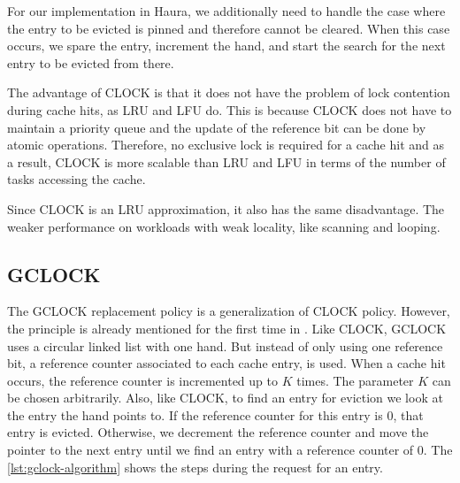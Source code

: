\documentclass[
	12pt,
	a4paper,
	abstract,
	bibliography=totoc,
	chapterprefix,
	headings=openright,
	numbers=endperiod,
	parskip=half,
	twoside,
]{scrreprt}
\begin{document}
For our implementation in Haura, we additionally need to handle the case where the entry to be 
evicted is pinned and therefore cannot be cleared.
When this case occurs, we spare the entry, increment the hand, and start the search for the next entry to be evicted from there.

The advantage of CLOCK is that it does not have the problem of lock contention during cache hits, as LRU and LFU do.
This is because CLOCK does not have to maintain a priority queue and 
the update of the reference bit can be done by atomic operations. 
Therefore, no exclusive lock is required for a cache hit and 
as a result, CLOCK is more scalable than LRU and LFU in terms of 
the number of tasks accessing the cache.

Since CLOCK is an LRU approximation, it also has the same disadvantage.
The weaker performance on workloads with weak locality, like scanning and looping.

\subsection{GCLOCK}

The GCLOCK replacement policy \cite{smith1978sequentiality} is a generalization of CLOCK policy.
However, the principle is already mentioned for the first time in \cite{corbato1968paging}.
Like CLOCK, GCLOCK uses a circular linked list with one hand.
But instead of only using one reference bit, a reference counter associated to each cache entry, is used.
When a cache hit occurs, the reference counter is incremented up to $K$ times.
The parameter $K$ can be chosen arbitrarily.
Also, like CLOCK, to find an entry for eviction we look at the entry the hand points to.
If the reference counter for this entry is 0, that entry is evicted.
Otherwise, we decrement the reference counter and move the pointer to the next entry 
until we find an entry with a reference counter of 0.
The \cref{lst:gclock-algorithm} shows the steps during the request for an entry.

\bigskip
\end{document}
